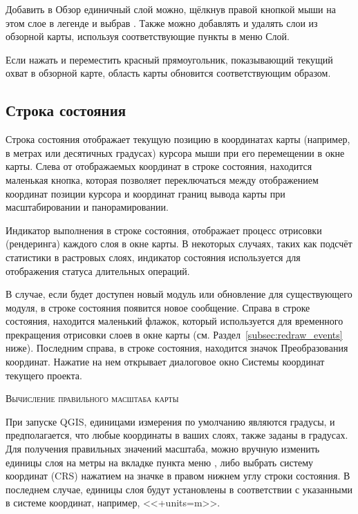 Добавить в Обзор единичный слой можно, щёлкнув правой кнопкой мыши на этом
слое в легенде и выбрав . Также можно
добавлять и удалять слои из обзорной карты, используя соответствующие
пункты в меню Слой.

Если нажать и переместить красный прямоугольник, показывающий текущий охват
в обзорной карте, область карты обновится соответствующим образом.

\subsection{Строка состояния}\label{label_statusbar}

Строка состояния отображает текущую позицию в координатах карты (например,
в метрах или десятичных градусах) курсора мыши при его перемещении в окне
карты. Слева от отображаемых координат в строке состояния, находится
маленькая кнопка, которая позволяет переключаться между отображением
координат позиции курсора и координат границ вывода карты при
масштабировании и панорамировании.

Индикатор выполнения в строке состояния, отображает процесс отрисовки
(рендеринга) каждого слоя в окне карты. В некоторых случаях, таких как
подсчёт статистики в растровых слоях, индикатор состояния используется
для отображения статуса длительных операций.

В случае, если будет доступен новый модуль или обновление для
существующего модуля, в строке состояния появится новое сообщение. Справа
в строке состояния, находится маленький флажок, который используется для
временного прекращения отрисовки слоев в окне карты
(см. Раздел~\ref{subsec:redraw_events} ниже). Последним справа, в строке
состояния, находится значок Преобразования координат. Нажатие на нем
открывает диалоговое окно Системы координат текущего проекта.

\begin{Tip}\caption{\textsc{Вычисление правильного масштаба карты}}
При запуске QGIS, единицами измерения по умолчанию являются градусы, и предполагается,
что любые координаты в ваших слоях, также заданы в градусах. Для
получения правильных значений масштаба, можно вручную изменить единицы
слоя на метры на вкладке  пункта меню 
\arrow {}, либо выбрать систему
координат (CRS) нажатием на значке
 в правом
нижнем углу строки состояния. В последнем случае, единицы слоя
будут установлены в соответствии с указанными в системе координат,
например, <<+units=m>>.
\end{Tip}

